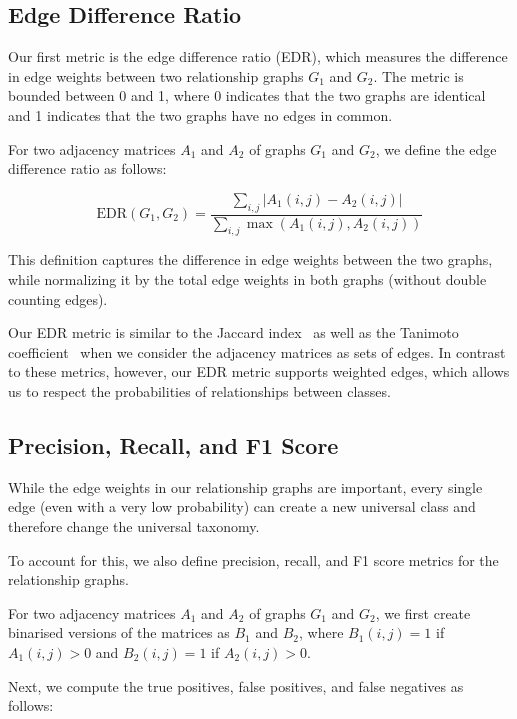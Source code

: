 \subsection{Edge Difference Ratio}

Our first metric is the edge difference ratio (EDR),
which measures the difference in edge weights between two relationship graphs $G_1$ and $G_2$.
The metric is bounded between 0 and 1, where 0 indicates that the two graphs are identical
and 1 indicates that the two graphs have no edges in common.

For two adjacency matrices $A_1$ and $A_2$ of graphs $G_1$ and $G_2$,
we define the edge difference ratio as follows:

\begin{equation}
    \text{EDR}(G_1, G_2) = \frac{\sum_{i,j} |A_1(i,j) - A_2(i,j)|}{\sum_{i,j} \max(A_1(i,j), A_2(i,j))}
\end{equation}

This definition captures the difference in edge weights between the two graphs,
while normalizing it by the total edge weights in both graphs (without double counting edges).

Our EDR metric is similar to the Jaccard index~\cite{jaccard_distribution_1912} as well as the Tanimoto coefficient~\cite{tanimoto_elementary_1958}
when we consider the adjacency matrices as sets of edges.
In contrast to these metrics, however, our EDR metric supports weighted edges,
which allows us to respect the probabilities of relationships between classes.

\subsection{Precision, Recall, and F1 Score}

While the edge weights in our relationship graphs are important,
every single edge (even with a very low probability) can create a new universal class
and therefore change the universal taxonomy.

To account for this, we also define precision, recall, and F1 score metrics
for the relationship graphs.

For two adjacency matrices $A_1$ and $A_2$ of graphs $G_1$ and $G_2$,
we first create binarised versions of the matrices as $B_1$ and $B_2$,
where $B_1(i,j) = 1$ if $A_1(i,j) > 0$ and $B_2(i,j) = 1$ if $A_2(i,j) > 0$.

Next, we compute the true positives, false positives, and false negatives as follows:

